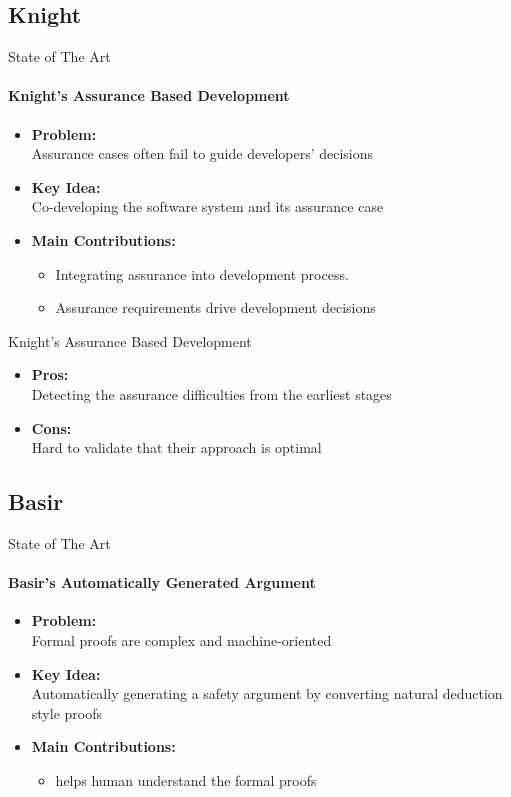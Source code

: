 \documentclass[xcolor=x11names,compress]{beamer}
\renewcommand{\(}{\begin{columns}}
\renewcommand{\)}{\end{columns}}
\newcommand{\<}[1]{\begin{column}{#1}}
\renewcommand{\>}{\end{column}}
\begin{document}
\subsection{Knight}
\begin{frame}{State of The Art}
\framesubtitle{Knight's Assurance Based Development \cite{Knight:Assurance}}
\begin{itemize}
\item \textbf{Problem:}\\Assurance cases often fail to guide developers' decisions
\item \textbf{Key Idea:} \\Co-developing the software system and its assurance case
\item \textbf{Main Contributions:}
\begin{itemize}
	\item Integrating assurance into development process.
    \item Assurance requirements drive development decisions
\end{itemize}
\end{itemize}

\end{frame}

\begin{frame}{Knight's Assurance Based Development}
\begin{itemize}
\item \textbf{Pros:} \\
	Detecting the assurance difficulties from the earliest stages
\item \textbf{Cons:} \\
	Hard to validate that their approach is optimal
\end{itemize}
\end{frame}


\subsection{Basir}
\begin{frame}{State of The Art}
\framesubtitle{Basir's Automatically Generated Argument \cite{Basir:safety}}
\begin{itemize}
\item \textbf{Problem:}\\Formal proofs are complex and machine-oriented
\item \textbf{Key Idea:} \\Automatically generating a safety argument by converting natural deduction style proofs
\item \textbf{Main Contributions:}
\begin{itemize}
	\item helps human understand the formal proofs
\end{itemize}
\end{itemize}

\end{frame}
\end{document}
